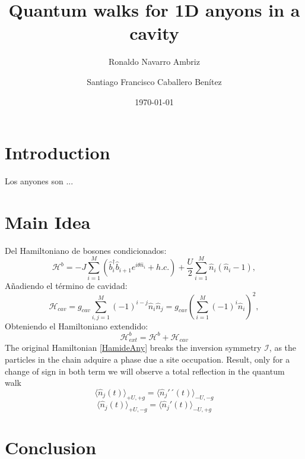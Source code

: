 \documentclass[a4paper, amsfonts, amssymb, amsmath, reprint, showkeys, nofootinbib, twoside]{revtex4-2}
\begin{document}
\title{Quantum walks for 1D anyons in a cavity}

\author{Ronaldo Navarro Ambriz}
\author{Santiago Francisco Caballero Benítez}

\date{\today} %

\begin{abstract}
\lipsum[1]
\end{abstract}



\maketitle


\section{Introduction} 
Los anyones son ... 
\section{Main Idea} 
Del Hamiltoniano de bosones condicionados: 
\begin{equation}\label{HamideAny}
\mathcal{H}^b=-J\sum_{i=1}^M \left( \hat{b}_{i}^\dagger   \hat{b}_{i+1} e^{\textit{i} \theta \hat{n}_i} + h.c. \right) + \frac{U}{2} \sum_{i=1}^M \hat{n}_i \left( \hat{n}_i - 1 \right),
\end{equation}
Añadiendo el término de cavidad: 
\begin{equation}
\mathcal{H}_{cav}= g_{cav} \sum_{i,j=1}^M \left( -1 \right)^{i-j} \hat{n}_i \hat{n}_j = g_{cav} \left( \sum_{i=1}^M (-1)^i \hat{n}_i \right)^2, 
\end{equation} 
Obteniendo el Hamiltoniano extendido: 
\begin{equation} 
\mathcal{H}^b_{ext} = \mathcal{H}^b +\mathcal{H}_{cav}
\end{equation} 
The original Hamiltonian \eqref{HamideAny} breaks the inversion symmetry $\mathcal{I}$, as the particles in the chain adquire a phase due a site occupation. 
Result, only for a change of sign in both term we will observe a total reflection in the quantum walk
\begin{equation} 
\langle \hat{n}_j (t) \rangle_{+U, +g}  = \langle \hat{n}_j'´ (t) \rangle_{-U, -g} 
\end{equation} 
\begin{equation} 
\langle \hat{n}_j (t) \rangle_{+U, -g}  = \langle \hat{n}_j' (t) \rangle_{-U, +g} 
\end{equation}

\section{Conclusion}




\appendix*

\end{document}
